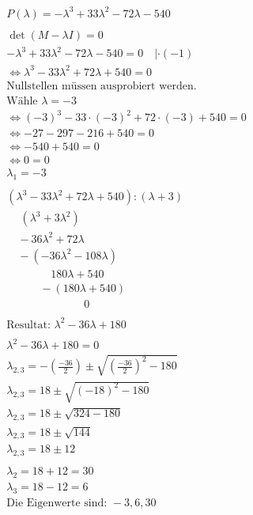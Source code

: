 \begin{align*}
\\
P(\lambda) = -\lambda^3 + 33\lambda^2 - 72\lambda - 540 \\\\
\det(M - \lambda I) = 0 \\
-\lambda^3 + 33\lambda^2 - 72\lambda - 540 = 0 \quad | \cdot(-1)\\
\Leftrightarrow \lambda^3 - 33\lambda^2 + 72\lambda + 540 = 0\\
\text{Nullstellen müssen ausprobiert werden.} \\
\text{Wähle }\lambda = -3 \\
\Leftrightarrow (-3)^3 - 33 \cdot (-3)^2 + 72 \cdot (-3) + 540 = 0 \\
\Leftrightarrow -27 - 297 - 216 + 540 = 0 \\
\Leftrightarrow -540 + 540 = 0 \\ 
\Leftrightarrow 0 = 0 \\
\lambda_1 = -3\\\\
(\lambda^3 - 33\lambda^2 + 72\lambda + 540) : (\lambda + 3) \\
\phantom{-}(\lambda^3 + 3\lambda^2) \\
\hline
\quad -36\lambda^2 + 72\lambda \\
\quad -(-36\lambda^2 - 108\lambda) \\
\hline
\quad \quad \quad \quad 180\lambda + 540 \\
\quad \quad \quad -(180\lambda + 540) \\
\hline
\quad \quad \quad \quad \quad \quad \quad 0 \\
\\
\text{Resultat: } \lambda^2 - 36\lambda + 180 \\
\\
\lambda^2 - 36\lambda + 180 = 0 \\
\lambda_{2,3} = -(\frac{-36}{2}) \pm \sqrt{(\frac{-36}{2})^2 - 180} \\
\lambda_{2,3} = 18 \pm \sqrt{(-18)^2 - 180} \\
\lambda_{2,3} = 18 \pm \sqrt{324 - 180} \\
\lambda_{2,3} = 18 \pm \sqrt{144} \\
\lambda_{2,3} = 18 \pm 12 \\
\\
\lambda_2 = 18 + 12 = 30 \\
\lambda_3 = 18 - 12 = 6 \\
\text{Die Eigenwerte sind: } -3, 6, 30 \\\\

\end{align*}
